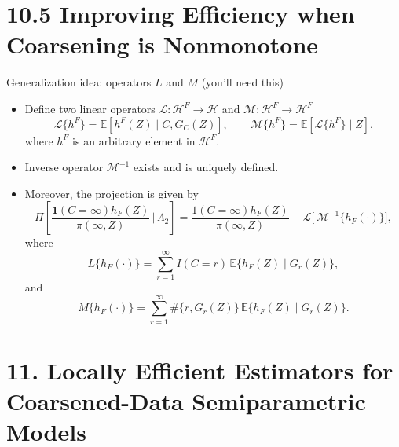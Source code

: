 \documentclass[xcolor=dvipsnames,aspectratio=169]{beamer}
\newcommand{\E}{\mathbb{E}}
\newcommand{\1}{\mathbbm{1}}
\begin{document}
\section{10.5 Improving Efficiency when Coarsening is Nonmonotone}

\begin{frame}{Generalization idea: operators $L$ and $M$ (you’ll need this)}
  \begin{tcolorbox}[colframe=red,title=Definition 4 and 5]
    \begin{itemize}
      \item Define two linear operators $\mathcal{L}:\mathcal{H}^{F}\to\mathcal{H}$ and  $\mathcal{M}:\mathcal{H}^{F}\to\mathcal{H}^{F}$
      \[
        \mathcal{L}\{h^{F}\} = \E\!\left[h^{F}(Z)\mid C,G_C(Z)\right],
        \qquad
        \mathcal{M}\{h^{F}\} = \E\!\left[\mathcal{L}\{h^{F}\}\mid Z\right].
      \]
      where $h^F$ is an arbitrary element in $\mathcal{H}^F$.
    \end{itemize}
  \end{tcolorbox}
\end{frame}

\begin{frame}
  \begin{tcolorbox}[colframe=Cyan,title=Theorem 10.6]
    \begin{itemize}
      \item Inverse operator $\mathcal{M}^{-1}$ exists and is uniquely defined. 
      \item Moreover, the projection is given by
      \[
        \Pi\!\left[
        \frac{\mathbf{1}(C=\infty)h_F(Z)}{\pi(\infty,Z)}
        \,\Bigg|\, \Lambda_2
        \right]
        = \frac{\mathcal{1} (C=\infty)h_F(Z)}{\pi(\infty,Z)} 
        - \mathcal{L}\!\big[\,\mathcal{M}^{-1}\{h_F(\cdot)\}\big],
    \]
    where
    \[
        L\{h_F(\cdot)\} = \sum_{r=1}^{\infty} I(C=r)\,\E\{h_F(Z)\mid G_r(Z)\},
    \]
    and
    \[
        M\{h_F(\cdot)\} = \sum_{r=1}^{\infty} \#\{r,G_r(Z)\}\,\E\{h_F(Z)\mid G_r(Z)\}.
    \]
    \end{itemize}
  \end{tcolorbox}
\end{frame}

\section{11. Locally Efficient Estimators for Coarsened-Data Semiparametric Models}
\end{document}
